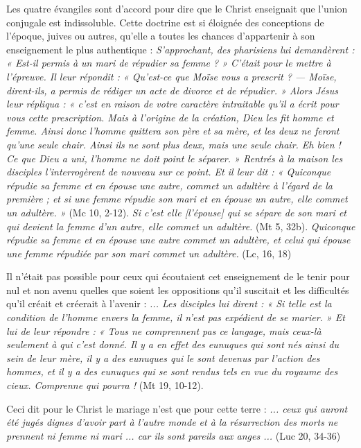  Les quatre évangiles sont d'accord pour dire que le Christ enseignait que l'union conjugale est indissoluble. Cette doctrine est si éloignée des conceptions de l'époque, juives ou autres, qu'elle a toutes les chances d'appartenir à son enseignement le plus authentique : \emph{S'approchant, des pharisiens lui demandèrent : « Est-il permis à un mari de répudier sa femme ? » C'était pour le mettre à l'épreuve. Il leur répondit : « Qu'est-ce que Moïse vous a prescrit ? --- Moïse, dirent-ils, a permis de rédiger un acte de divorce et de répudier. » Alors Jésus leur répliqua : « c'est en raison de votre caractère intraitable qu'il a écrit pour vous cette prescription. Mais à l'origine de la création, Dieu les fit homme et femme. Ainsi donc l'homme quittera son père et sa mère, et les deux ne feront qu'une seule chair. Ainsi ils ne sont plus deux, mais une seule chair. Eh bien ! Ce que Dieu a uni, l'homme ne doit point le séparer. » Rentrés à la maison les disciples l'interrogèrent de nouveau sur ce point. Et il leur dit : « Quiconque répudie sa femme et en épouse une autre, commet un adultère à l'égard de la première ; et si une femme répudie son mari et en épouse un autre, elle commet un adultère. »} (Mc 10, 2-12). \emph{Si c'est elle \emph{[l'épouse]} qui se sépare de son mari et qui devient la femme d'un autre, elle commet un adultère.} (Mt 5, 32b). \emph{Quiconque répudie sa femme et en épouse une autre commet un adultère, et celui qui épouse une femme répudiée par son mari commet un adultère.} (Lc, 16, 18) 

  Il n'était pas possible pour ceux qui écoutaient cet enseignement de le tenir pour nul et non avenu quelles que soient les oppositions qu'il suscitait et les difficultés qu'il créait et créerait à l'avenir : \emph{... Les disciples lui dirent : « Si telle est la condition de l'homme envers la femme, il n'est pas expédient de se marier. » Et lui de leur répondre : « Tous ne comprennent pas ce langage, mais ceux-là seulement à qui c'est donné. Il y a en effet des eunuques qui sont nés ainsi du sein de leur mère, il y a des eunuques qui le sont devenus par l'action des hommes, et il y a des eunuques qui se sont rendus tels en vue du royaume des cieux. Comprenne qui pourra !} (Mt 19, 10-12). 
 
 Ceci dit pour le Christ le mariage n'est que pour cette terre : \emph{... ceux qui auront été jugés dignes d'avoir part à l'autre monde et à la résurrection des morts ne prennent ni femme ni mari ... car ils sont pareils aux anges ...} (Luc 20, 34-36)

